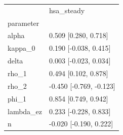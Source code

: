 \begin{tabular}{ll}
\toprule
 & hsa\_steady \\
parameter &  \\
\midrule
alpha & 0.509 [0.280, 0.718] \\
kappa\_0 & 0.190 [-0.038, 0.415] \\
delta & 0.003 [-0.023, 0.034] \\
rho\_1 & 0.494 [0.102, 0.878] \\
rho\_2 & -0.450 [-0.769, -0.123] \\
phi\_1 & 0.854 [0.749, 0.942] \\
lambda\_ez & 0.233 [-0.228, 0.833] \\
n & -0.020 [-0.190, 0.222] \\
\bottomrule
\end{tabular}

